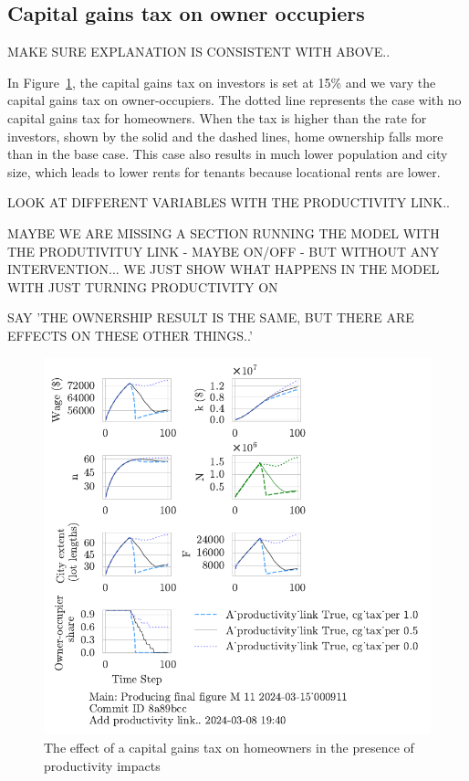 \newpage
\subsection{Capital gains tax on owner occupiers}
{\color{red} MAKE SURE EXPLANATION IS CONSISTENT WITH ABOVE..}

In Figure~\ref{fig:Productivity_link_and_CGpers_ownership_trajectory}, the capital gains tax on investors is set at 15\% and we vary the capital gains tax on owner-occupiers. The dotted line represents the case with no capital gains tax for homeowners. When the tax is higher than the rate for investors, shown by the solid and the dashed lines,  home ownership falls more than in the base case. This case also results in much lower population and city size, which leads to lower rents for tenants because locational rents are lower.

{\color{red}
LOOK AT DIFFERENT VARIABLES WITH THE PRODUCTIVITY LINK..


MAYBE WE ARE MISSING A SECTION RUNNING THE MODEL WITH THE PRODUTIVITUY LINK - MAYBE ON/OFF - BUT WITHOUT ANY INTERVENTION... WE JUST SHOW WHAT HAPPENS IN THE MODEL WITH JUST TURNING PRODUCTIVITY ON

SAY 'THE OWNERSHIP RESULT IS THE SAME, BUT THERE ARE EFFECTS ON THESE OTHER THINGS..'
}

\begin{figure}
    \centering
    \includegraphics[scale=1, trim={0 1.4cm 0 0},clip]{fig/With-productivity_link_cg_tax_per-000911.pdf}
    \caption{The effect of a capital gains tax on homeowners in the presence of productivity impacts}
    \label{fig:Productivity_link_and_CGpers_ownership_trajectory}
\end{figure}

